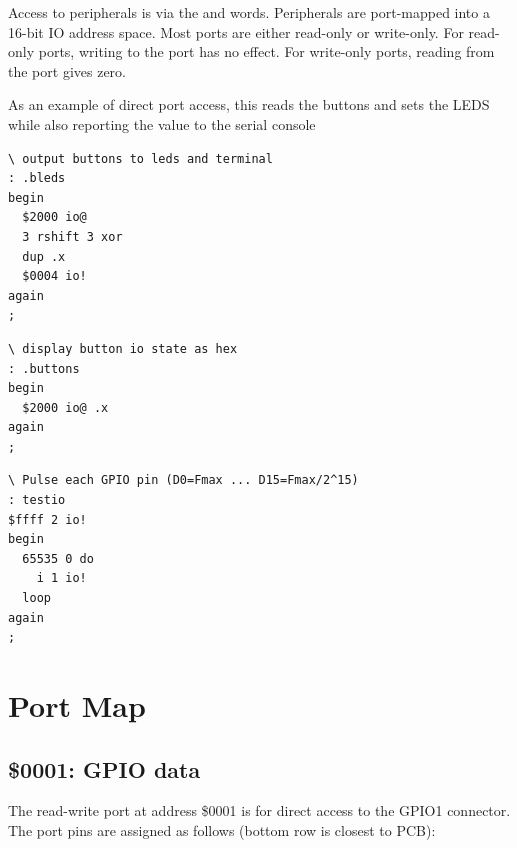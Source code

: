 Access to peripherals is via the
 and  words.
Peripherals are port-mapped into a 16-bit IO address space.
Most ports are either read-only or write-only.
For read-only ports, writing to the port has no effect.
For write-only ports, reading from the port gives zero.

As an example of direct port access, this reads the buttons and sets the LEDS while also reporting the value to the serial console

\begin{framed}
\begin{Verbatim}
\ output buttons to leds and terminal
: .bleds
begin
  $2000 io@
  3 rshift 3 xor
  dup .x
  $0004 io!
again
;
\end{Verbatim}
\end{framed}


\begin{framed}
\begin{Verbatim}
\ display button io state as hex 
: .buttons
begin
  $2000 io@ .x
again
;
\end{Verbatim}
\end{framed}


\begin{framed}
\begin{Verbatim}
\ Pulse each GPIO pin (D0=Fmax ... D15=Fmax/2^15)
: testio
$ffff 2 io!
begin
  65535 0 do
    i 1 io!
  loop
again
;
\end{Verbatim}
\end{framed}



\newpage
\section{Port Map}
\subsection{\$0001: GPIO data}

The read-write port at address \$0001 is for direct access to the GPIO1
connector. The port pins are assigned as follows (bottom row is closest to PCB):


